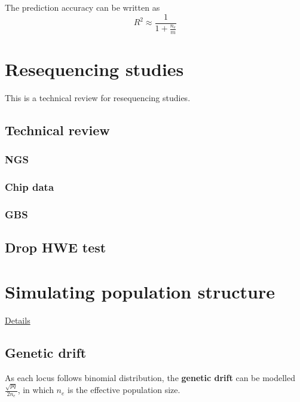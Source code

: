 \documentclass[]{book}
\begin{document}
The prediction accuracy can be written as
\[R^2 \approx \frac{1}{1+\frac{n_e}{m}}\]

\hypertarget{resequencing-studies}{%
\chapter{Resequencing studies}\label{resequencing-studies}}

This is a technical review for resequencing studies.

\hypertarget{technical-review}{%
\section{Technical review}\label{technical-review}}

\hypertarget{ngs}{%
\subsection{NGS}\label{ngs}}

\hypertarget{chip-data}{%
\subsection{Chip data}\label{chip-data}}

\hypertarget{gbs}{%
\subsection{GBS}\label{gbs}}

\hypertarget{drop-hwe-test}{%
\section{Drop HWE test}\label{drop-hwe-test}}

\hypertarget{simulating-population-structure}{%
\chapter{Simulating population
structure}\label{simulating-population-structure}}

\href{http://rpubs.com/gc5k/EigenGWAScore}{Details}

\hypertarget{genetic-drift}{%
\section{Genetic drift}\label{genetic-drift}}

As each locus follows binomial distribution, the \textbf{genetic drift}
can be modelled \(\frac{\sqrt{pq}}{2n_e}\), in which \(n_e\) is the
effective population size.
\end{document}
